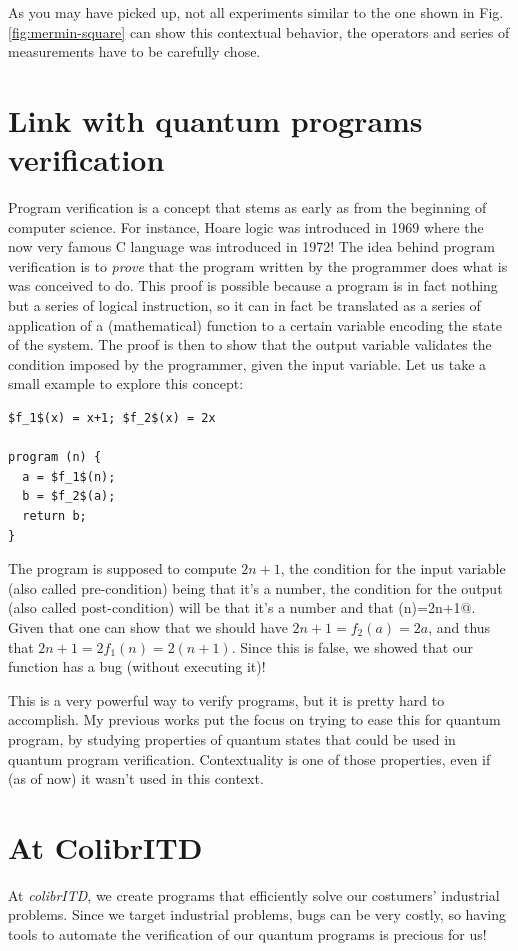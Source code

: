 \documentclass{article}
\begin{document}
As you may have picked up, not all experiments similar to the one shown in Fig.
\ref{fig:mermin-square} can show this contextual behavior, the operators and
series of measurements have to be carefully chose.

\section{Link with quantum programs verification}
\label{sec:link_with_quantum_programs_verification}

Program verification is a concept that stems as early as from the beginning of
computer science. For instance, Hoare logic \cite{Hoa69} was introduced in 1969
where the now very famous C language was introduced in 1972! The idea behind
program verification is to \emph{prove} that the program written by the
programmer does what is was conceived to do. This proof is possible because a
program is in fact nothing but a series of logical instruction, so it can in fact
be translated as a series of application of a (mathematical) function to a
certain variable encoding the state of the system. The proof is then to show that
the output variable validates the condition imposed by the programmer, given the
input variable. Let us take a small example to explore this concept:
\begin{lstlisting}
$f_1$(x) = x+1; $f_2$(x) = 2x

program (n) {
  a = $f_1$(n);
  b = $f_2$(a);
  return b;
}
\end{lstlisting}
The program is supposed to compute $2n+1$, the condition for the input variable
(also called pre-condition) being that it's a number, the condition for the
output (also called post-condition) will be that it's a number and that 
\verb@program(n)=2n+1@. Given that one can show that we should have 
$2n+1=f_2(a)=2a$, and thus that $2n+1=2f_1(n)=2(n+1)$. Since this is false, we
showed that our function has a bug (without executing it)!

This is a very powerful way to verify programs, but it is pretty hard to
accomplish. My previous works put the focus on trying to ease this for quantum
program, by studying properties of quantum states that could be used in quantum
program verification. Contextuality is one of those properties, even if (as of
now) it wasn't used in this context.

\section*{At ColibrITD}

At \emph{colibrITD}, we create programs that efficiently solve our costumers'
industrial problems. Since we target industrial problems, bugs can be very
costly, so having tools to automate the verification of our quantum programs is
precious for us!



\end{document}
